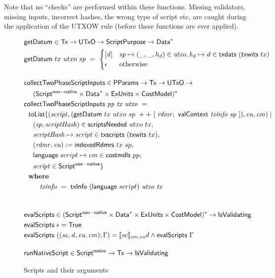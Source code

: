 Note that no ``checks'' are performed within these functions.
Missing validators, missing inputs, incorrect hashes, the wrong type of script etc,
are caught during the application of the UTXOW rule (before these functions are ever applied).

\begin{figure}[htb]
  \begin{align*}
    & \fun{getDatum} \in \Tx \to \UTxO \to \ScriptPurpose \to \seqof{\Data} \\
    & \fun{getDatum}~{tx}~{utxo}~{sp}~=~
      \begin{cases}
        [\var{d}] & \var{sp} \mapsto (\_, \_, h_d) \in \var{utxo}, \var{h_d}\mapsto \var{d} \in \fun{txdats}~(\fun{txwits}~tx) \\
        \epsilon  & \text{otherwise}
      \end{cases}
    \nextdef
    & \fun{collectTwoPhaseScriptInputs} \in \PParams \to \Tx \to \UTxO \to \\
    & ~~~~ \seqof{(\ScriptNonNative \times \seqof{\Data} \times \ExUnits \times \CostMod)} \\
    & \fun{collectTwoPhaseScriptInputs} ~\var{pp}~\var{tx}~ \var{utxo} ~=~ \\
    & ~~\fun{toList} \{ (\var{script}, (\fun{getDatum}~tx~utxo~sp~++~[~\var{rdmr};~\fun{valContext}~\var{txinfo}~\var{sp}~]), \var{eu}, \var{cm}) \mid \\
    & ~~~~(\var{sp}, \var{scriptHash}) \in \fun{scriptsNeeded}~{utxo}~{tx}, \\
    & ~~~~\var{scriptHash}\mapsto \var{script}\in \fun{txscripts}~(\fun{txwits}~tx), \\
    & ~~~~(\var{rdmr}, \var{eu}) := \fun{indexedRdmrs}~tx~sp, \\
    & ~~~~\fun{language}~{script} \mapsto \var{cm} \in \fun{costmdls}~{pp}, \\
    & ~~~~\var{script} \in \ScriptNonNative \} \\
    & \where \\
    & ~~~~~~~ \var{txinfo}~=~\fun{txInfo}~(\fun{language}~{script})~\var{utxo}~\var{tx} \\
    \nextdef
    & \fun{evalScripts} \in \seqof{(\ScriptNonNative \times \seqof{\Data} \times \ExUnits \times \CostMod)} \to \IsValidating \\
    & \fun{evalScripts}~\epsilon = \True \\
    & \fun{evalScripts}~((\var{sc}, \var{d}, \var{eu}, \var{cm});\Gamma) =
      \llbracket sc \rrbracket_{cm,\var{eu}} d \land \fun{evalScripts}~\Gamma
    \nextdef
    &\fun{runNativeScript} \in\ScriptNative \to \Tx \to \IsValidating
  \end{align*}
  \caption{Scripts and their arguments}
  \label{fig:functions:script2}
\end{figure}

